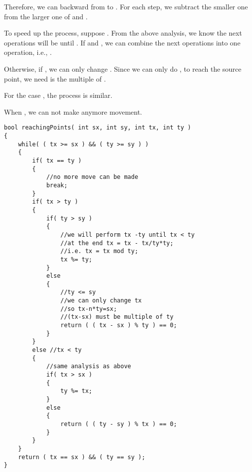 Therefore, we can backward from  to . For each step, we subtract the smaller one from the larger one of  and . 

To speed up the process, suppose . From the above analysis, we know the next operations will be  until . If  and , we can combine the next operations into one operation, i.e., .

Otherwise, if , we can only change . Since we can only do , to reach the source point, we need  is the multiple of .

For the case , the process is similar. 

When , we can not make anymore movement.

\setcounter{lstlisting}{0}
\begin{lstlisting}[style=customc, caption={Bacward With Modular}]
bool reachingPoints( int sx, int sy, int tx, int ty )
{
    while( ( tx >= sx ) && ( ty >= sy ) )
    {
        if( tx == ty )
        {
            //no more move can be made
            break;
        }
        if( tx > ty )
        {
            if( ty > sy )
            {
                //we will perform tx -ty until tx < ty
                //at the end tx = tx - tx/ty*ty;
                //i.e. tx = tx mod ty;
                tx %= ty;
            }
            else
            {
                //ty <= sy
                //we can only change tx
                //so tx-n*ty=sx;
                //(tx-sx) must be multiple of ty
                return ( ( tx - sx ) % ty ) == 0;
            }
        }
        else //tx < ty
        {
            //same analysis as above
            if( tx > sx )
            {
                ty %= tx;
            }
            else
            {
                return ( ( ty - sy ) % tx ) == 0;
            }
        }
    }
    return ( tx == sx ) && ( ty == sy );
}
\end{lstlisting}